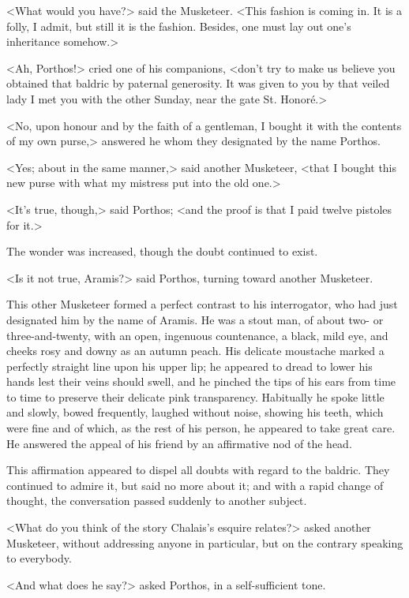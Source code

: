 <What would you have?> said the Musketeer. <This fashion is coming in. It is a folly, I admit, but still it is the fashion. Besides, one must lay out one's inheritance somehow.> 

<Ah, Porthos!> cried one of his companions, <don't try to make us believe you obtained that baldric by paternal generosity. It was given to you by that veiled lady I met you with the other Sunday, near the gate St. Honoré.> 

<No, upon honour and by the faith of a gentleman, I bought it with the contents of my own purse,> answered he whom they designated by the name Porthos. 

<Yes; about in the same manner,> said another Musketeer, <that I bought this new purse with what my mistress put into the old one.> 

<It's true, though,> said Porthos; <and the proof is that I paid twelve pistoles for it.> 

The wonder was increased, though the doubt continued to exist. 

<Is it not true, Aramis?> said Porthos, turning toward another Musketeer. 

This other Musketeer formed a perfect contrast to his interrogator, who had just designated him by the name of Aramis. He was a stout man, of about two- or three-and-twenty, with an open, ingenuous countenance, a black, mild eye, and cheeks rosy and downy as an autumn peach. His delicate moustache marked a perfectly straight line upon his upper lip; he appeared to dread to lower his hands lest their veins should swell, and he pinched the tips of his ears from time to time to preserve their delicate pink transparency. Habitually he spoke little and slowly, bowed frequently, laughed without noise, showing his teeth, which were fine and of which, as the rest of his person, he appeared to take great care. He answered the appeal of his friend by an affirmative nod of the head. 

This affirmation appeared to dispel all doubts with regard to the baldric. They continued to admire it, but said no more about it; and with a rapid change of thought, the conversation passed suddenly to another subject. 

<What do you think of the story Chalais's esquire relates?> asked another Musketeer, without addressing anyone in particular, but on the contrary speaking to everybody. 

<And what does he say?> asked Porthos, in a self-sufficient tone. 

